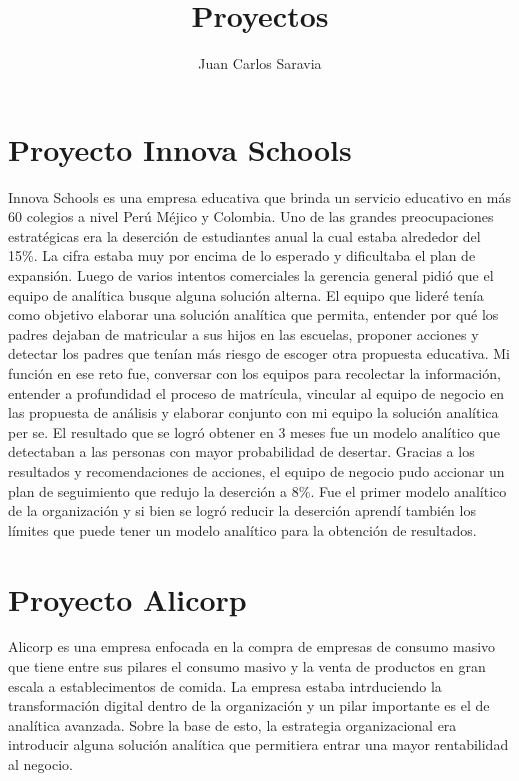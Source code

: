 \documentclass{article}
\date{}%
\begin{document}
\title{Proyectos} \author{Juan Carlos Saravia}

\maketitle

\section*{Proyecto Innova Schools}

Innova Schools es una empresa educativa que brinda un servicio educativo en más 60 colegios a nivel Perú Méjico y Colombia. Uno de las grandes preocupaciones estratégicas era la deserción de estudiantes anual la cual estaba alrededor del 15\%. La cifra estaba muy por encima de lo esperado y dificultaba el plan de expansión. Luego de varios intentos comerciales la gerencia general pidió que el equipo de analítica busque alguna solución alterna. El equipo que lideré tenía como objetivo elaborar una solución analítica que permita, entender por qué los padres dejaban de matricular a sus hijos en las escuelas, proponer acciones y detectar los padres que tenían más riesgo de escoger otra propuesta educativa. Mi función en ese reto fue, conversar con los equipos para recolectar la información, entender a profundidad el proceso de matrícula, vincular al equipo de negocio en las propuesta de análisis y elaborar conjunto con mi equipo la solución analítica per se. El resultado que se logró obtener en 3 meses fue un modelo analítico que detectaban a las personas con mayor probabilidad de desertar. Gracias a los resultados y recomendaciones de acciones, el equipo de negocio pudo accionar un plan de seguimiento que redujo la deserción a 8\%. Fue el primer modelo analítico de la organización y si bien se logró reducir la deserción aprendí también los límites que puede tener un modelo analítico para la obtención de resultados. 


\section*{Proyecto Alicorp}

Alicorp es una empresa enfocada en la compra de empresas de consumo masivo que tiene entre sus pilares el consumo masivo y la venta de productos en gran escala a establecimentos de comida. La empresa estaba intrduciendo la transformación digital dentro de la organización y un pilar importante es el de analítica avanzada. Sobre la base de esto, la estrategia organizacional era introducir alguna solución analítica que permitiera entrar una mayor rentabilidad al negocio. 
\end{document}

